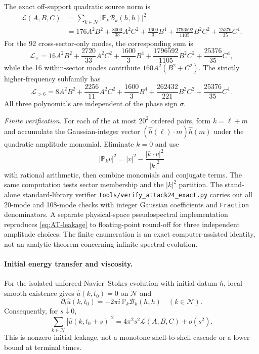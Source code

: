 The exact off-support quadratic source norm is
\begin{equation}\label{eq:AT-leakage}
\begin{aligned}
 \mathcal L(A,B,C)
 &=\sum_{k\in\mathcal N}|\mathbb P_k\mathcal B_k(h,h)|^2\\
 &=176A^2B^2+\frac{8000}{33}A^2C^2
  +\frac{1600}{3}B^4
  +\frac{1796592}{1105}B^2C^2
  +\frac{25376}{35}C^4 .
\end{aligned}
\end{equation}
For the 92 cross-sector-only modes, the corresponding sum is
\begin{equation}\label{eq:AT-cross}
 \mathcal L_\times
 =16A^2B^2+\frac{2720}{33}A^2C^2
 +\frac{1600}{3}B^4+\frac{1796592}{1105}B^2C^2
 +\frac{25376}{35}C^4,
\end{equation}
while the 16 within-sector modes contribute
$160A^2(B^2+C^2)$. The strictly higher-frequency subfamily has
\begin{equation}\label{eq:AT-high}
 \mathcal L_{>6}
 =8A^2B^2+\frac{2256}{11}A^2C^2
 +\frac{1600}{3}B^4+\frac{262432}{221}B^2C^2
 +\frac{25376}{35}C^4 .
\end{equation}
All three polynomials are independent of the phase sign $\sigma$.

\emph{Finite verification.}
For each of the at most $20^2$ ordered pairs, form
$k=\ell+m$ and accumulate the Gaussian-integer vector
$(\widehat h(\ell)\cdot m)\widehat h(m)$ under the quadratic
amplitude monomial. Eliminate $k=0$ and use
\[
 |\mathbb P_kv|^2
  =|v|^2-\frac{|k\cdot v|^2}{|k|^2}
\]
with rational arithmetic, then combine monomials and conjugate
terms. The same computation tests sector membership and the
$|k|^2$ partition. The stand-alone standard-library verifier
\texttt{tools/verify\_attack24\_exact.py} carries out all 20-mode
and 108-mode checks with integer Gaussian coefficients and
\texttt{Fraction} denominators. A separate physical-space
pseudospectral implementation reproduces
\eqref{eq:AT-leakage} to floating-point round-off for three
independent amplitude choices. The finite enumeration is an exact
computer-assisted identity, not an analytic theorem concerning
infinite spectral evolution.

\paragraph{Initial energy transfer and viscosity.}
For the isolated unforced Navier--Stokes evolution with initial
datum $h$, local smooth existence gives
$\widehat u(k,t_0)=0$ on $\mathcal N$ and
\[
 \partial_t\widehat u(k,t_0)
   =-2\pi i\,\mathbb P_k\mathcal B_k(h,h)
   \quad(k\in\mathcal N).
\]
Consequently, for $s\downarrow0$,
\begin{equation}\label{eq:AT-shorttime}
 \sum_{k\in\mathcal N}|\widehat u(k,t_0+s)|^2
 =4\pi^2s^2\mathcal L(A,B,C)+o(s^2).
\end{equation}
This is nonzero initial leakage, not a monotone shell-to-shell
cascade or a lower bound at terminal times.

